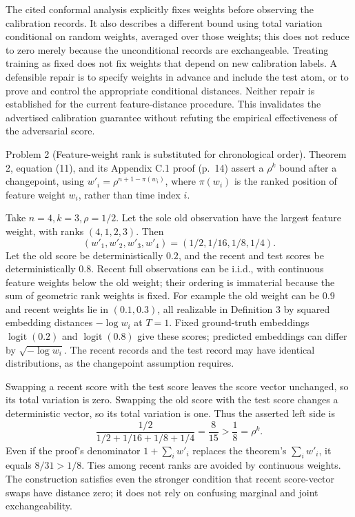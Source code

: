\documentclass[10pt]{article}
\begin{document}
The cited conformal analysis explicitly fixes weights before observing the calibration records. It also describes a different bound using total variation conditional on random weights, averaged over those weights; this does not reduce to zero merely because the unconditional records are exchangeable. Treating training as fixed does not fix weights that depend on new calibration labels. A defensible repair is to specify weights in advance and include the test atom, or to prove and control the appropriate conditional distances. Neither repair is established for the current feature-distance procedure. This invalidates the advertised calibration guarantee without refuting the empirical effectiveness of the adversarial score.\par
Problem 2 (Feature-weight rank is substituted for chronological order).  Theorem 2, equation (11), and its Appendix C.1 proof (p. 14) assert a \(\rho^k\) bound after a changepoint, using \(w'_i=\rho^{n+1-\pi(w_i)}\), where \(\pi(w_i)\) is the ranked position of feature weight \(w_i\), rather than time index \(i\).\par
Take \(n=4,k=3,\rho=1/2\). Let the sole old observation have the largest feature weight, with ranks \((4,1,2,3)\). Then \[(w'_1,w'_2,w'_3,w'_4)=(1/2,1/16,1/8,1/4).\] Let the old score be deterministically \(0.2\), and the recent and test scores be deterministically \(0.8\). Recent full observations can be i.i.d., with continuous feature weights below the old weight; their ordering is immaterial because the sum of geometric rank weights is fixed. For example the old weight can be \(0.9\) and recent weights lie in \((0.1,0.3)\), all realizable in Definition 3 by squared embedding distances \(-\log w_i\) at \(T=1\). Fixed ground-truth embeddings \(\operatorname{logit}(0.2)\) and \(\operatorname{logit}(0.8)\) give these scores; predicted embeddings can differ by \(\sqrt{-\log w_i}\). The recent records and the test record may have identical distributions, as the changepoint assumption requires.\par
Swapping a recent score with the test score leaves the score vector unchanged, so its total variation is zero. Swapping the old score with the test score changes a deterministic vector, so its total variation is one. Thus the asserted left side is \[\frac{1/2}{1/2+1/16+1/8+1/4}=\frac8{15}
 >\frac18=\rho^k.\] Even if the proof’s denominator \(1+\sum_iw'_i\) replaces the theorem’s \(\sum_iw'_i\), it equals \(8/31>1/8\). Ties among recent ranks are avoided by continuous weights. The construction satisfies even the stronger condition that recent score-vector swaps have distance zero; it does not rely on confusing marginal and joint exchangeability.\par
\end{document}
